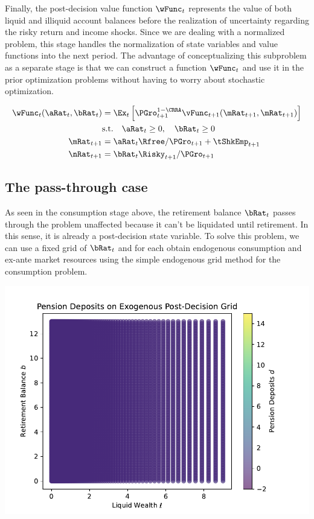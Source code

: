 \documentclass[\econtexRoot/SequentialEGM]{subfiles}
\begin{document}
Finally, the post-decision value function $\wFunc_{t}$ represents the value of both liquid and illiquid account balances before the realization of uncertainty regarding the risky return and income shocks. Since we are dealing with a normalized problem, this stage handles the normalization of state variables and value functions into the next period. The advantage of conceptualizing this subproblem as a separate stage is that we can construct a function $\wFunc_{t}$ and use it in the prior optimization problems without having to worry about stochastic optimization.

\begin{equation}
    \begin{split}
        \wFunc_{t}(\aRat_{t}, \bRat_{t}) & = \Ex_{t} \left[ \PGro_{t+1}^{1-\CRRA} \vFunc_{t+1}(\mRat_{t+1}, \mRat_{t+1}) \right] \\
        & \text{s.t.} \quad \aRat_{t} \ge 0, \quad \bRat_{t} \ge 0 \\
        \mRat_{t+1} & = \aRat_{t} \Rfree / \PGro_{t+1}  + \tShkEmp_{t+1} \\
        \nRat_{t+1} & = \bRat_{t} \Risky_{t+1} /  \PGro_{t+1}
    \end{split}
\end{equation}

\subsection{The pass-through case}

As seen in the consumption stage above, the retirement balance $\bRat_{t}$ passes through the problem unaffected because it can't be liquidated until retirement. In this sense, it is already a post-decision state variable. To solve this problem, we can use a fixed grid of $\bRat_{t}$ and for each obtain endogenous consumption and ex-ante market resources using the simple endogenous grid method for the consumption problem.

\includegraphics[width=\textwidth]{Figures/ExogenousGrid.pdf}
\end{document}
